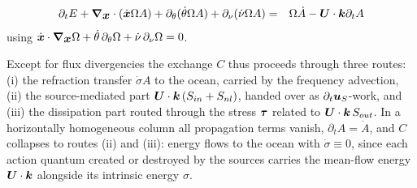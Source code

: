 \documentclass[12pt]{article}
\newif\ifdetail
\newcommand{\beq}  { \begin{eqnarray} }
\newcommand{\eeq}  { \end{eqnarray}}
\newcommand{\eq }  [1]{Eq.~(\ref{#1})}  %
\renewcommand{\v}[1]{{\mbox{\boldmath$ #1 $}}}  %
\newcommand{\pt}[1]{{\partial_t #1}}
\newcommand{\p}{{\partial}}
\newcommand{\vn}{{\v \nabla}}
\begin{document}
\ifdetail
\subsubsection*{Energy transfer to mean flow}

Multiplying \eq{eq6} by $\sigma$ gives the budget of the intrinsic energy
$E = \sigma A$. Since $\sigma = 2 \pi \nu$ is the spectral coordinate, it
commutes with $\p_t$, $\vn_{\v x}$ and $\p_\theta$; only the frequency
advection generates
$\sigma \, \p_\nu ( \dot \nu A) = \p_\nu ( \dot \nu E) - \dot \sigma A$
so that
\beq \label{eq:ebudget}
\pt{E} + \vn_{\v x} \cdot ( \dot{\v x} E ) + \p_\theta ( \dot \theta E )
 + \p_\nu ( \dot \nu E )
 &=& \sigma \dot A + \dot \sigma A
\eeq
All terms on the left are conservative transport of intrinsic energy; on the
right, $\sigma \dot A$ is the energy of the source terms and $\dot \sigma A$
is the local energy exchange with the mean flow mediated by propagation.
Multiplying \eq{eq6} instead by $\Omega(\v x, \theta, f, t)$
yields 
\ifdetail
\beq 
  \Omega  \pt{ A}    +  \Omega  \vn_{\v x}  \cdot   (\dot{\v x} A ) 
  + \Omega \p_{\theta}  (\dot{\theta} A  )
 + \Omega \p_{\nu} ( \dot{\nu} A)
 &=& \Omega  \dot A 
 \\
  \pt{ \Omega   A}  - A \p_t \Omega 
  +  \vn_{\v x}  \cdot ( \Omega  \dot{\v x} A )  
  + \p_{\theta}  (\Omega  \dot{\theta} A  )
  +\p_{\nu} (  \Omega  \dot{\nu} A) 
  - A ( \dot{\v x}    \cdot \vn_x  \Omega 
   + \dot{\theta} \p_{\theta} \Omega  
  +  \dot{\nu}  \p_\nu  \Omega )
   &=& \Omega  \dot A 
   \eeq
   \beq
  \pt{ \Omega   A} 
  +  \vn_{\v x}  \cdot ( \Omega  \dot{\v x} A )  
  + \p_{\theta}  (\Omega  \dot{\theta} A  )
  +\p_{\nu} (  \Omega  \dot{\nu} A) 
    &=& \Omega  \dot A  + A \p_t \Omega 
\eeq
\fi
\beq \label{eq:absE}
 \p_t   E + \vn_{\v x} \cdot ( \dot{\v x} \Omega A )
 + \p_\theta ( \dot \theta \Omega A ) + \p_\nu ( \dot \nu \Omega A )
 &=& \Omega \dot A  - \v U \cdot \v k \p_t A
\eeq
using $\dot{\v x} \cdot \vn_{\v x} \Omega + \dot \theta \, \p_\theta \Omega
 + \dot \nu \, \p_\nu \Omega = 0$.

Except for flux divergencies the
exchange $C$ thus proceeds through three routes: (i) the refraction transfer
$ \dot \sigma A$ to the ocean,
carried by the frequency advection,
(ii) the source-mediated part
$\v U \cdot \v k \, ( S_{in} + S_{nl} ) $,
handed over as $\p_t \v u_S$-work, and (iii) the dissipation part routed
through the stress $\v \tau$ related to $\v U \cdot \v k \,  S_{out}$.
In a horizontally homogeneous column all propagation terms vanish, $\p_t A = \dot
A$, and $C$ collapses to routes (ii) and (iii): energy flows to the ocean
with $\dot \sigma \equiv 0$, since each action quantum created or destroyed
by the sources carries the mean-flow energy $\v U \cdot \v k$ alongside its
intrinsic energy $\sigma$.
\end{document}
